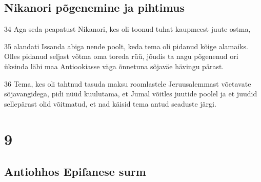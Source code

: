 \section*{Nikanori põgenemine ja pihtimus}

\par 34 Aga seda peapatust Nikanori, kes oli toonud tuhat kaupmeest juute ostma,
\par 35 alandati Issanda abiga nende poolt, keda tema oli pidanud kõige alamaiks. Olles pidanud seljast võtma oma toreda rüü, jõudis ta nagu põgenenud ori üksinda läbi maa Antiookiasse väga õnnetuna sõjaväe hävingu pärast.
\par 36 Tema, kes oli tahtnud tasuda maksu roomlastele Jeruusalemmast võetavate sõjavangidega, pidi nüüd kuulutama, et Jumal võitles juutide poolel ja et juudid sellepärast olid võitmatud, et nad käisid tema antud seaduste järgi.



\chapter{9}


\section*{Antiohhos Epifanese surm}

